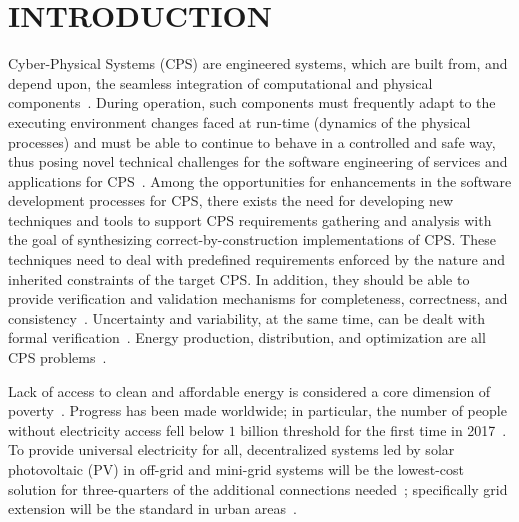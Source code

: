 \documentclass[review]{elsarticle}
\begin{document}

\section{INTRODUCTION}
Cyber-Physical Systems  (CPS) are engineered systems, which are built from, and depend upon, 
the seamless integration of computational  and  physical  components~\cite{NSF2015}. 
During operation, such components must frequently adapt to the executing environment changes 
faced at run-time (dynamics of the physical processes) and must be able to continue to behave 
in a controlled and safe way, thus posing novel technical challenges for the software engineering of services and applications for CPS~\cite{Metzger2014}. %
%
Among the opportunities for enhancements in the software development processes for CPS, there exists the need for developing new techniques and tools to support CPS requirements gathering and analysis with the goal of synthesizing correct-by-construction implementations of CPS. These techniques need to deal with predefined requirements enforced by the nature and inherited constraints of the target CPS. In addition, they should be able to provide verification and validation mechanisms for completeness, correctness, and consistency~\cite{Al-Jaroodi2016}. Uncertainty and variability, at the same time, can be dealt with formal verification~\cite{NESSI}. Energy production, distribution, and optimization are all CPS problems~\cite{UC}. 

Lack of access to clean and affordable energy is considered a core dimension of poverty~\cite{Hussein2012}. Progress has been made worldwide; in particular, the number of people without electricity access fell below $1$ billion threshold for the first time in 2017~\cite{IEAweo2018}. To provide universal electricity for all, decentralized systems led by solar photovoltaic (PV) in off-grid and mini-grid systems will be the lowest-cost solution for three-quarters of the additional connections needed~\cite{Hussein2012}; specifically grid extension will be the standard in urban areas~\cite{IEAweo2018}.
\end{document}

